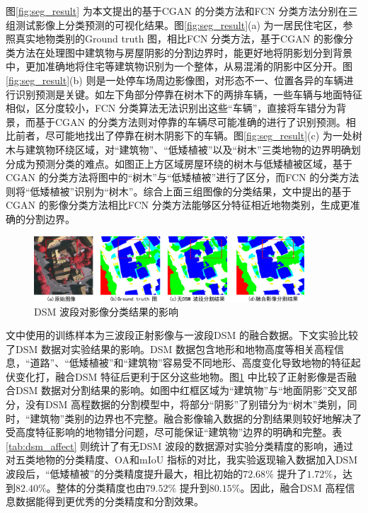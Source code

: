 图\ref{fig:seg_result} 为本文提出的基于CGAN 的分类方法和FCN 分类方法分别在三组测试影像上分类预测的可视化结果。图\ref{fig:seg_result}(a) 为一居民住宅区，参照真实地物类别的Ground truth 图，相比FCN 分类方法，基于CGAN 的影像分类方法在处理图中建筑物与房屋阴影的分割边界时，能更好地将阴影划分到背景中，更加准确地将住宅等建筑物识别为一个整体，从易混淆的阴影中区分开。图\ref{fig:seg_result}(b) 则是一处停车场周边影像图，对形态不一、位置各异的车辆进行识别预测是关键。如左下角部分停靠在树木下的两排车辆，一些车辆与地面特征相似，区分度较小，FCN 分类算法无法识别出这些“车辆”，直接将车错分为背景，而基于CGAN 的分类方法则对停靠的车辆尽可能准确的进行了识别预测。相比前者，尽可能地找出了停靠在树木阴影下的车辆。图\ref{fig:seg_result}(c) 为一处树木与建筑物环绕区域，对“建筑物”、“低矮植被”以及“树木”三类地物的边界明确划分成为预测分类的难点。如图正上方区域房屋环绕的树木与低矮植被区域，基于CGAN 的分类方法将图中的“树木”与“低矮植被”进行了区分，而FCN 的分类方法则将“低矮植被”识别为“树木”。综合上面三组图像的分类结果，文中提出的基于CGAN 的影像分类方法相比FCN 分类方法能够区分特征相近地物类别，生成更准确的分割边界。

\begin{figure}[htb]
  \centering
  \includegraphics[width=0.9\textwidth]{figures/dsm_affect}
  \caption{DSM 波段对影像分类结果的影响}\label{fig:dsm_affect}
\end{figure}

文中使用的训练样本为三波段正射影像与一波段DSM 的融合数据。下文实验比较了DSM 数据对实验结果的影响。DSM 数据包含地形和地物高度等相关高程信息，“道路”、“低矮植被”和“建筑物”容易受不同地形、高度变化导致地物的特征起伏变化打，融合DSM 特征后更利于区分这些地物。图\ref{fig:dsm_affect} 中比较了正射影像是否融合DSM 数据对分割结果的影响。如图中红框区域为“建筑物”与“地面阴影”交叉部分，没有DSM 高程数据的分割模型中，将部分“阴影”了别错分为“树木”类别，同时，“建筑物”类别的边界也不完整。融合影像输入数据的分割结果则较好地解决了受高度特征影响的地物错分问题，尽可能保证“建筑物”边界的明确和完整。表\ref{tab:dsm_affect} 则统计了有无DSM 波段的数据源对实验分类精度的影响，通过对五类地物的分类精度、OA和mIoU 指标的对比，我实验返现输入数据加入DSM 波段后，“低矮植被”的分类精度提升最大，相比初始的$72.68\%$ 提升了$1.72\%$，达到$82.40\%$。整体的分类精度也由$79.52\%$ 提升到$80.15\%$。因此，融合DSM 高程信息数据能得到更优秀的分类精度和分割效果。

